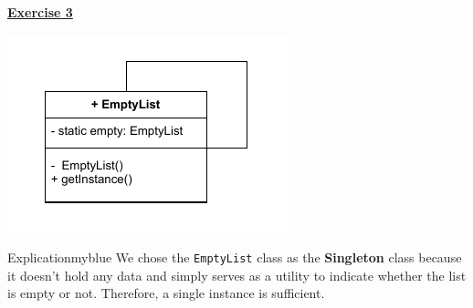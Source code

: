 \newpage
\begin{center}
    \Huge{\textbf{\underline{Exercise 3}}}
\end{center}

\vspace{0.45cm}

\begin{center}
    \includegraphics[height=0.22\textheight]{Exercices/EX3/ex3.drawio.pdf}
\end{center}

\vspace{0.25cm}

\begin{prettyBox}{Explication}{myblue}
We chose the \texttt{EmptyList} class as the \textbf{Singleton} class because 
it doesn't hold any data and simply serves as a utility to indicate whether the list is empty or not. 
Therefore, a single instance is sufficient.
\end{prettyBox}

